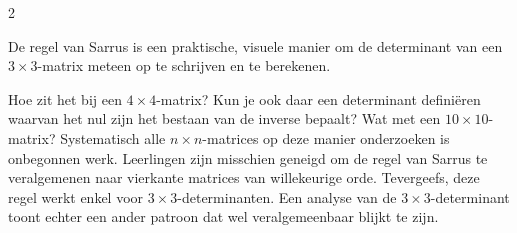 \begin{multicols}{2}



De regel van Sarrus is een praktische, visuele manier om de determinant van een $3\times 3$-matrix meteen op te schrijven en te berekenen.

Hoe zit het bij een $4\times 4$-matrix? Kun je ook daar een determinant defini\"eren waarvan het nul zijn het bestaan van de inverse bepaalt? Wat met een $10 \times 10$-matrix? Systematisch alle $n \times n$-matrices op deze manier onderzoeken is onbegonnen werk. Leerlingen zijn misschien geneigd om de regel van Sarrus te veralgemenen naar vierkante matrices van willekeurige orde. Tevergeefs, deze regel werkt enkel voor $3\times 3$-determinanten. Een analyse van de $3\times 3$-determinant toont echter een ander patroon dat wel veralgemeenbaar blijkt te zijn.

\end{multicols}
